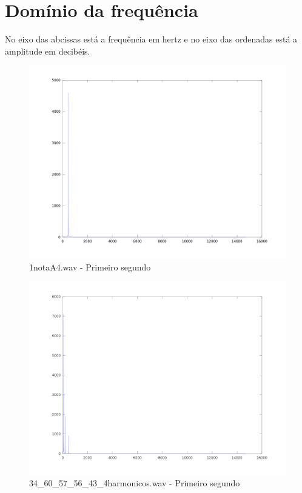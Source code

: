 \documentclass[brazil,times]{abnt}
\begin{document}
	\section{Domínio da frequência}
		No eixo das abcissas está a frequência em hertz e no eixo das ordenadas está a amplitude em decibéis.

			\begin{figure}[h!]
			\begin{center}
			  \includegraphics[width=150mm]{imagens/1notaA4_freq_seg_1.png}
			  \caption[1notaA4.wav - Primeiro segundo]{1notaA4.wav - Primeiro segundo}
			\end{center}
			\end{figure}

			\begin{figure}[h!]
			\begin{center}
			  \includegraphics[width=150mm]{imagens/34_60_57_56_43_4harmonicos_freq_seg_1.png}
			  \caption[34\_60\_57\_56\_43\_4harmonicos.wav - Primeiro segundo]{34\_60\_57\_56\_43\_4harmonicos.wav - Primeiro segundo}
			\end{center}
			\end{figure}
			
\end{document}
